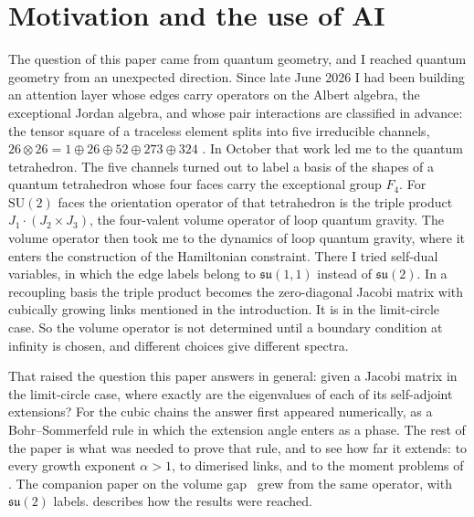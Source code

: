 \section{Motivation and the use of AI}
\label{sec:history}

The question of this paper came from quantum geometry, and I reached quantum geometry
from an unexpected direction. Since late June 2026 I had been building an attention layer
whose edges carry operators on the Albert algebra, the exceptional Jordan algebra, and whose
pair interactions are classified in advance: the tensor square of a traceless element splits
into five irreducible channels, $26\otimes26=1\oplus26\oplus52\oplus273\oplus324$
\cite{FitchPairChannels}. In October that work led me to the quantum tetrahedron. The five
channels turned out to label a basis of the shapes of a quantum tetrahedron whose four faces
carry the exceptional group $F_4$. For $\mathrm{SU}(2)$ faces the orientation operator of
that tetrahedron is the triple product $J_1\cdot(J_2\times J_3)$, the four-valent volume
operator of loop quantum gravity. The volume operator then took me to the dynamics of loop
quantum gravity, where it enters the construction of the Hamiltonian constraint. There I
tried self-dual variables, in which the edge labels belong to $\mathfrak{su}(1,1)$ instead
of $\mathfrak{su}(2)$. In a recoupling basis the triple product becomes the zero-diagonal
Jacobi matrix with cubically growing links mentioned in the introduction. It is in the
limit-circle case. So the volume operator is not determined until a boundary condition at
infinity is chosen, and different choices give different spectra.

That raised the question this paper answers in general: given a Jacobi matrix in the
limit-circle case, where exactly are the eigenvalues of each of its self-adjoint
extensions? For the cubic chains the answer first appeared numerically, as a
Bohr--Sommerfeld rule in which the extension angle enters as a phase. The rest of the paper
is what was needed to prove that rule, and to see how far it extends: to every growth
exponent $\alpha>1$, to dimerised links, and to the moment problems of .
The companion paper on the volume gap~\cite{FitchVolumeGap} grew from the same operator,
with $\mathfrak{su}(2)$ labels.  describes how the results were
reached.

